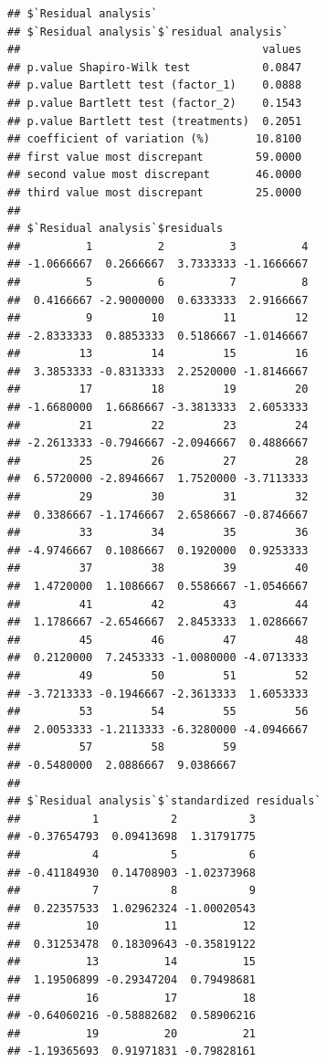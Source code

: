 \documentclass[
]{article}
\begin{document}
\begin{verbatim}
## $`Residual analysis`
## $`Residual analysis`$`residual analysis`
##                                     values
## p.value Shapiro-Wilk test           0.0847
## p.value Bartlett test (factor_1)    0.0888
## p.value Bartlett test (factor_2)    0.1543
## p.value Bartlett test (treatments)  0.2051
## coefficient of variation (%)       10.8100
## first value most discrepant        59.0000
## second value most discrepant       46.0000
## third value most discrepant        25.0000
## 
## $`Residual analysis`$residuals
##          1          2          3          4 
## -1.0666667  0.2666667  3.7333333 -1.1666667 
##          5          6          7          8 
##  0.4166667 -2.9000000  0.6333333  2.9166667 
##          9         10         11         12 
## -2.8333333  0.8853333  0.5186667 -1.0146667 
##         13         14         15         16 
##  3.3853333 -0.8313333  2.2520000 -1.8146667 
##         17         18         19         20 
## -1.6680000  1.6686667 -3.3813333  2.6053333 
##         21         22         23         24 
## -2.2613333 -0.7946667 -2.0946667  0.4886667 
##         25         26         27         28 
##  6.5720000 -2.8946667  1.7520000 -3.7113333 
##         29         30         31         32 
##  0.3386667 -1.1746667  2.6586667 -0.8746667 
##         33         34         35         36 
## -4.9746667  0.1086667  0.1920000  0.9253333 
##         37         38         39         40 
##  1.4720000  1.1086667  0.5586667 -1.0546667 
##         41         42         43         44 
##  1.1786667 -2.6546667  2.8453333  1.0286667 
##         45         46         47         48 
##  0.2120000  7.2453333 -1.0080000 -4.0713333 
##         49         50         51         52 
## -3.7213333 -0.1946667 -2.3613333  1.6053333 
##         53         54         55         56 
##  2.0053333 -1.2113333 -6.3280000 -4.0946667 
##         57         58         59 
## -0.5480000  2.0886667  9.0386667 
## 
## $`Residual analysis`$`standardized residuals`
##           1           2           3 
## -0.37654793  0.09413698  1.31791775 
##           4           5           6 
## -0.41184930  0.14708903 -1.02373968 
##           7           8           9 
##  0.22357533  1.02962324 -1.00020543 
##          10          11          12 
##  0.31253478  0.18309643 -0.35819122 
##          13          14          15 
##  1.19506899 -0.29347204  0.79498681 
##          16          17          18 
## -0.64060216 -0.58882682  0.58906216 
##          19          20          21 
## -1.19365693  0.91971831 -0.79828161 

\end{verbatim}
\end{document}
